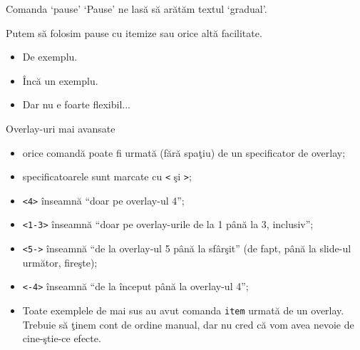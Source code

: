 \documentclass{beamer}
\begin{document}
\begin{frame}{Comanda `pause'}
`Pause' ne lasă să arătăm textul `gradual'.

\pause Putem să folosim pause cu itemize sau orice altă facilitate.
\begin{itemize}
\pause \item De exemplu.
\pause \item Încă un exemplu.
\pause \item Dar nu e foarte flexibil...
\end{itemize}
\end{frame}

\begin{frame}{Overlay-uri mai avansate}
\begin{itemize}
\item<3-> orice comandă poate fi urmată (fără spaţiu) de un specificator de
overlay;
\item<4-> specificatoarele sunt marcate cu \texttt{<} şi \texttt{>};
\item<5-> \texttt{<4>} înseamnă ``doar pe overlay-ul 4'';
\item<5-> \texttt{<1-3>} înseamnă ``doar pe overlay-urile de la 1 până la 3,
inclusiv'';
\item<6-> \texttt{<5->} înseamnă ``de la overlay-ul 5 până la sfârşit'' (de
fapt, până la slide-ul următor, fireşte);
\item<6-> \texttt{<-4>} înseamnă ``de la început până la overlay-ul 4'';
\item<7-> Toate exemplele de mai sus au avut comanda \texttt{item} urmată de
un overlay. Trebuie să ţinem cont de ordine manual, dar nu cred că vom avea
nevoie de cine-ştie-ce efecte.
\end{itemize}
\end{frame}
\end{document}
